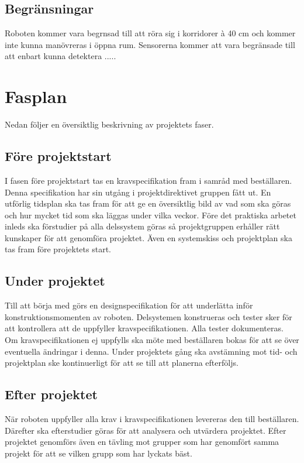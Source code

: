 \documentclass[11pt]{article}
\begin{document}
\begin{flushleft}
\subsection{Begränsningar}
Roboten kommer vara begrnsad till att röra sig i korridorer à 40 cm och kommer inte kunna manövreras i öppna rum. Sensorerna kommer att vara begränsade till att enbart kunna detektera ..... 

\pagebreak
\section{Fasplan}
Nedan följer en översiktlig beskrivning av projektets faser.
\subsection{Före projektstart}
I fasen före projektstart tas en kravspecifikation fram i samråd med beställaren. Denna specifikation har sin utgång i projektdirektivet gruppen fått ut. En utförlig tidsplan ska tas fram för att ge en översiktlig bild av vad som ska göras och hur mycket tid som ska läggas under vilka veckor. Före det praktiska arbetet inleds ska förstudier på alla delssystem göras så projektgruppen erhåller rätt kunskaper för att genomföra projektet. Även en systemskiss och projektplan ska tas fram före projektets start.

\subsection{Under projektet}
Till att börja med görs en designspecifikation för att underlätta inför konstruktionsmomenten av roboten. Delsystemen konstrueras och tester sker för att kontrollera att de uppfyller kravspecifikationen. Alla tester dokumenteras. Om kravspecifikationen ej uppfylls ska möte med beställaren bokas för att se över eventuella ändringar i denna. Under projektets gång ska avstämning mot tid- och projektplan ske kontinuerligt för att se till att planerna efterföljs.

\subsection{Efter projektet}
När roboten uppfyller alla krav i kravspecifikationen levereras den till beställaren. Därefter ska efterstudier göras för att analysera och utvärdera projektet. Efter projektet genomförs även en tävling mot grupper som har genomfört samma projekt för att se vilken grupp som har lyckats bäst. 


\end{flushleft}
\end{document}
